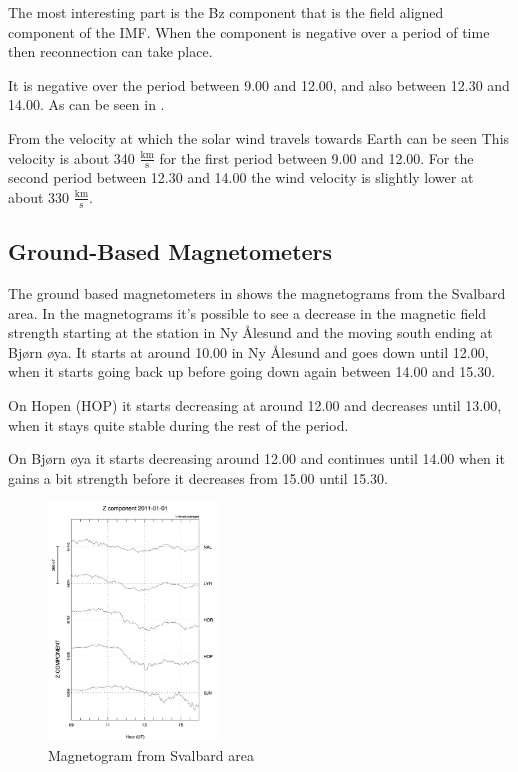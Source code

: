 The most interesting part is the Bz component that is the field aligned component of the IMF. When the component is negative over a period of time then reconnection can take place.

It is negative over the period between 9.00 and 12.00, and also between 12.30 and 14.00. As can be seen in .  

From  the velocity at which the solar wind travels towards Earth can be seen This velocity is about 340 $\frac{\textrm{km}}{\textrm{s}}$ for the first period between 9.00 and 12.00. For the second period between 12.30 and 14.00 the wind velocity is slightly lower at about 330 $\frac{\textrm{km}}{\textrm{s}}$. 




\subsection{Ground-Based Magnetometers}

The ground based magnetometers in  shows the magnetograms from the Svalbard area. In the magnetograms it's possible to see a decrease in the magnetic field strength starting at the station in Ny \AA lesund and the moving south ending at Bj\o rn \o ya. It starts at around 10.00 in Ny \AA lesund and goes down until 12.00, when it starts going back up before going down again between 14.00 and 15.30. 

On Hopen (HOP) it starts decreasing at around 12.00 and decreases until 13.00, when it stays quite stable during the rest of the period.

On Bj\o rn \o ya it starts decreasing around 12.00 and continues until 14.00 when it gains a bit strength before it decreases from 15.00 until 15.30. 

\begin{figure}[ht!]
\centering
\includegraphics[width=0.4\textwidth]{Figures/Magnetogram/Z_gram.jpg}
\caption{Magnetogram from Svalbard area}
\label{fig:GBM}
\end{figure}


